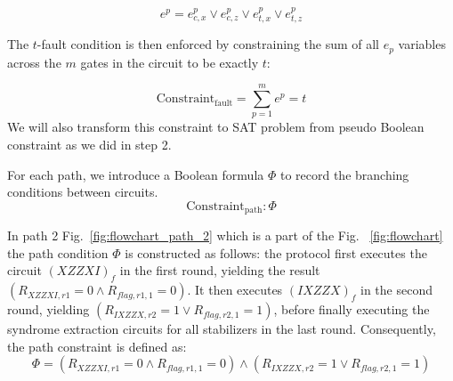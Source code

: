 \documentclass[acmsmallw,review]{acmart}
\begin{document}
\begin{equation}
e^{p} = e_{c,x}^{p} \lor e_{c,z}^{p} \lor e_{t,x}^{p} \lor e_{t,z}^{p}
\end{equation}

The $t$-fault condition is then enforced by constraining the sum of all $e_p$ variables across the $m$ gates in the circuit to be exactly $t$:

\begin{equation}
\mathrm{Constraint}_{\mathrm{fault}}  = \sum_{p=1}^{m} e^{p}= t
\end{equation}
We will also transform this constraint to SAT problem from pseudo Boolean constraint as we did in step 2.

For each path, we introduce a Boolean formula $\Phi$ to record the branching conditions between circuits. 
\begin{equation}
\mathrm{Constraint}_{\mathrm{path}} : \Phi
\end{equation}


In path 2  Fig.~\ref{fig:flowchart_path_2} which is a part of the Fig. ~\ref{fig:flowchart} the path condition $\Phi$ is  constructed as follows: the protocol first executes the circuit $(XZZXI)_f$ in the first round, yielding the result $(R_{XZZXI,r1} = 0 \land R_{flag,r1,1} = 0)$. It then executes $(IXZZX)_f$ in the second round, yielding $(R_{IXZZX,r2} = 1 \lor R_{flag,r2,1} = 1)$, before finally executing the syndrome extraction circuits for all stabilizers in the last round. Consequently, the path constraint is defined as:
\begin{equation}
\Phi = (R_{XZZXI,r1} = 0 \land R_{flag,r1,1} = 0) \land (R_{IXZZX,r2} = 1 \lor R_{flag,r2,1} = 1)
\end{equation}
\end{document}
